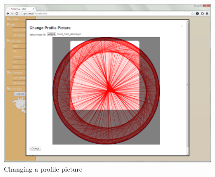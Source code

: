 \begin{figure}[htbp]
	\centering
		\includegraphics[width=1.0\textwidth]{images/profilePicChange.png}
	\caption{Changing a profile picture}
	\label{fig:profilePicChange}
\end{figure}

